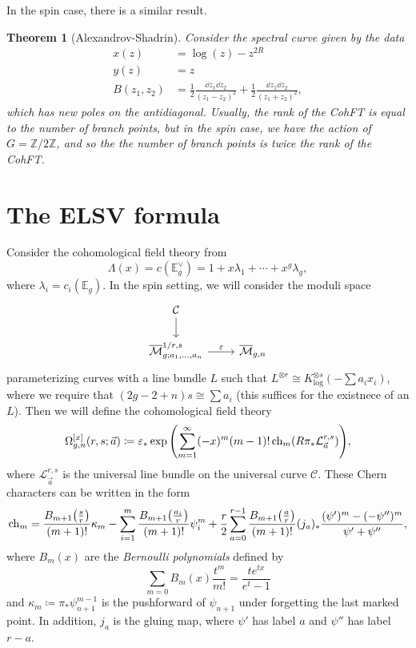 \documentclass[leqno, openany]{memoir}
\newtheorem{thm}{Theorem}[section]
\theoremstyle{definition}
\theoremstyle{remark}
\theoremstyle{plain}
\theoremstyle{definition}
\theoremstyle{remark}
\newcommand{\Z}{\mathbb{Z}}
\newcommand{\ep}{\varepsilon}
\newcommand{\mc}[1]{\mathcal{#1}}
\newcommand{\on}[1]{\operatorname{#1}}
\newcommand{\ol}[1]{\overline{#1}}
\begin{document}
In the spin case, there is a similar result.
\begin{thm}[Alexandrov-Shadrin]
  Consider the spectral curve given by the data
  \begin{align*}
    x(z) &= \log(z) - z^{2R} \\
    y(z) &= z \\
    B(z_1,z_2) &= \frac{1}{2} \frac{\dd{z_1} \dd{z_2}}{(z_1-z_2)^2} + \frac{1}{2}\frac{\dd{z_1} \dd{z_2}}{(z_1+z_2)^2},
  \end{align*}
  which has new poles on the antidiagonal. Usually, the rank of the CohFT is equal to the number of branch points, but in the spin case, we have the action of $G = \Z/2\Z$, and so the the number of branch points is twice the rank of the CohFT.
\end{thm}

\section{The ELSV formula}
\label{sec:elsv}

Consider the cohomological field theory from~
\[ \Lambda(x) = c(\mathbb{E}_g^{\vee}) = 1 + x\lambda_1 + \cdots + x^g \lambda_g, \]
where $\lambda_i = c_i(\mathbb{E}_g)$. In the spin setting, we will consider the moduli space
\begin{equation*}
  \begin{tikzcd}
    \mc{C} \ar{d} \\
    \ol{\mc{M}}_{g;a_1,\ldots,a_n}^{1/r, s} \ar{r}{\ep} & \ol{\mc{M}}_{g,n}
  \end{tikzcd}
\end{equation*}
parameterizing curves with a line bundle $L$ such that $L^{\otimes r} \cong K_{\log}^{\otimes s}(-\sum a_i x_i)$, where we require that $(2g-2+n)s \cong \sum a_i$ (this suffices for the existnece of an $L$). Then we will define the cohomological field theory
\[ \Omega_{g,n}^{[x]}(r,s;\vec{a}) \coloneqq \ep_* \exp\qty(\sum_{m=1}^{\infty}(-x)^m(m-1)! \on{ch}_m(R\pi_* \mc{L}_{\vec{a}}^{r,s})), \]
where $\mc{L}_{\vec{a}}^{r,s}$ is the universal line bundle on the universal curve $\mc{C}$. These Chern characters can be written in the form
\[ \on{ch}_m = \frac{B_{m+1}\qty(\frac{s}{r})}{(m+1)!} \kappa_m - \sum_{i=1}^m \frac{B_{m+1}\qty(\frac{a_i}{r})}{(m+1)!} \psi_i^m + \frac{r}{2} \sum_{a=0}^{r-1} \frac{B_{m+1}\qty(\frac{a}{r})}{(m+1)!} (j_a)_* \frac{(\psi')^m - (-\psi'')^m}{\psi' + \psi''}, \]
where $B_m(x)$ are the \textit{Bernoulli polynomials} defined by
\[ \sum_{m=0} B_m(x) \frac{t^m}{m!} = \frac{te^{tx}}{e^t-1} \]
and $\kappa_m \coloneqq \pi_* \psi_{n+1}^{m-1}$ is the pushforward of $\psi_{n+1}$ under forgetting the last marked point. In addition, $j_a$ is the gluing map, where $\psi'$ has label $a$ and $\psi''$ has label $r-a$.
\end{document}
